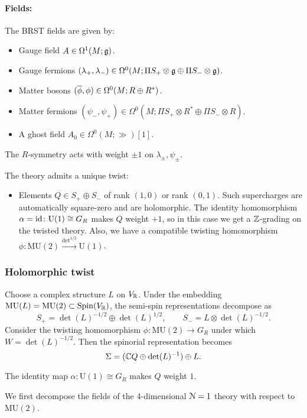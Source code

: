 \documentclass[10pt, oneside]{article}
\newcommand{\MU}{\mathrm{MU}}
\renewcommand{\U}{\mathrm{U}}
\begin{document}
\paragraph{Fields:} The BRST fields are given by:
\begin{itemize}
\item Gauge field $A \in \Omega^1(M; \fg)$.
\item Gauge fermions $(\lambda_+, \lambda_-) \in \Omega^0(M; \Pi S_+ \otimes \fg \oplus \Pi S_- \otimes \fg)$.
\item Matter bosons $(\Bar{\phi}, \phi) \in \Omega^0(M; R \oplus R^*)$.
\item Matter fermions $(\psi_-,\psi_+) \in \Omega^0(M; \Pi S_+ \otimes R^* \oplus \Pi S_- \otimes R)$.
\item A ghost field $A_0\in \Omega^0(M; \gg)[1]$.
\end{itemize}

The $R$-symmetry acts with weight $\pm 1$ on $\lambda_\pm, \psi_\pm$.

The theory admits a unique twist:
\begin{itemize}
\item Elements $Q\in S_+\oplus S_-$ of rank $(1, 0)$ or rank $(0, 1)$. Such supercharges are automatically square-zero and are holomorphic. The identity homomorphism $\alpha = {\rm id} \colon \U(1) \cong G_R$ makes $Q$ weight $+1$, so in this case we get a $\ZZ$-grading on the twisted theory. Also, we have a compatible twisting homomorphism $\phi\colon \MU(2)\xrightarrow{\det^{1/2}}\U(1)$.
\end{itemize}

\subsubsection{Holomorphic twist}
\label{sect:4d1holomorphictwist}

Choose a complex structure $L$ on $V_\RR$. Under the embedding $\MU(L) = \MU(2) \subset \Spin(V_\RR)$, the semi-spin representations decompose as
\[
S_+ = \det(L)^{-1/2} \oplus \det(L)^{1/2},\qquad S_- = L \otimes \det(L)^{-1/2} .
\]
Consider the twisting homomorphism $\phi\colon\MU(2)\rightarrow G_R$ under which $W = \det(L)^{-1/2}$. Then the spinorial representation becomes
\[\Sigma = (\CC Q\oplus \det(L)^{-1})\oplus L.\]

The identity map $\alpha\colon \U(1)\cong G_R$ makes $Q$ weight $1$.

We first decompose the fields of the 4-dimensional $\mc N=1$ theory with respect to $\MU(2)$.
\vspace{-10pt}
\end{document}
